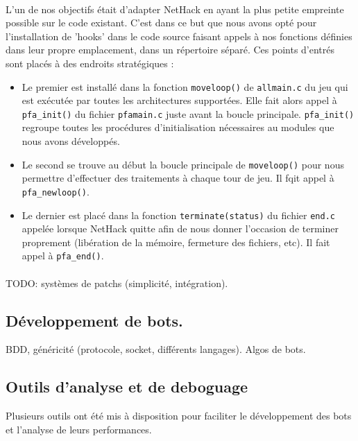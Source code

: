 \documentclass[a4paper,11pt]{article}
\begin{document}
\paragraph{} L'un de nos objectifs était d'adapter NetHack en ayant la plus petite empreinte possible sur le code existant. C'est dans ce but que nous avons opté pour l'installation de 'hooks' dans le code source faisant appels à nos fonctions définies dans leur propre emplacement, dans un répertoire séparé. Ces points d'entrés sont placés à des endroits stratégiques :
\begin{itemize}
	\item Le premier est installé dans la fonction \verb!moveloop()! de \verb!allmain.c! du jeu qui est exécutée par toutes les architectures supportées. Elle fait alors appel à \verb!pfa_init()! du fichier \verb!pfamain.c! juste avant la boucle principale. \verb!pfa_init()! regroupe toutes les procédures d'initialisation nécessaires au modules que nous avons développés.
	\item Le second se trouve au début la boucle principale de \verb!moveloop()! pour nous permettre d'effectuer des traitements à chaque tour de jeu. Il fqit appel à \verb!pfa_newloop()!.
	\item Le dernier est placé dans la fonction \verb!terminate(status)! du fichier \verb!end.c! appelée lorsque NetHack quitte afin de nous donner l'occasion de terminer proprement (libération de la mémoire, fermeture des fichiers, etc). Il fait appel à \verb!pfa_end()!.
\end{itemize}

\paragraph{} TODO: systèmes de patchs (simplicité, intégration).


\subsection{Développement de bots.}

BDD, généricité (protocole, socket, différents langages).
Algos de bots.

\subsection{Outils d'analyse et de deboguage}

Plusieurs outils ont été mis à disposition pour faciliter le développement des bots et l'analyse de leurs performances.
\end{document}
